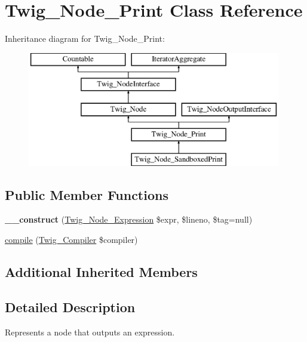 \hypertarget{class_twig___node___print}{}\section{Twig\+\_\+\+Node\+\_\+\+Print Class Reference}
\label{class_twig___node___print}
Inheritance diagram for Twig\+\_\+\+Node\+\_\+\+Print\+:\begin{figure}[H]
\begin{center}
\leavevmode
\includegraphics[height=5.000000cm]{class_twig___node___print}
\end{center}
\end{figure}
\subsection*{Public Member Functions}
\begin{DoxyCompactItemize}
\item 
\hypertarget{class_twig___node___print_a3846bdad0632470525ae7d3080f6b188}{}{\bfseries \+\_\+\+\_\+construct} (\hyperlink{class_twig___node___expression}{Twig\+\_\+\+Node\+\_\+\+Expression} \$expr, \$lineno, \$tag=null)\label{class_twig___node___print_a3846bdad0632470525ae7d3080f6b188}

\item 
\hyperlink{class_twig___node___print_a4e0faa87c3fae583620b84d3607085da}{compile} (\hyperlink{class_twig___compiler}{Twig\+\_\+\+Compiler} \$compiler)
\end{DoxyCompactItemize}
\subsection*{Additional Inherited Members}


\subsection{Detailed Description}
Represents a node that outputs an expression.

